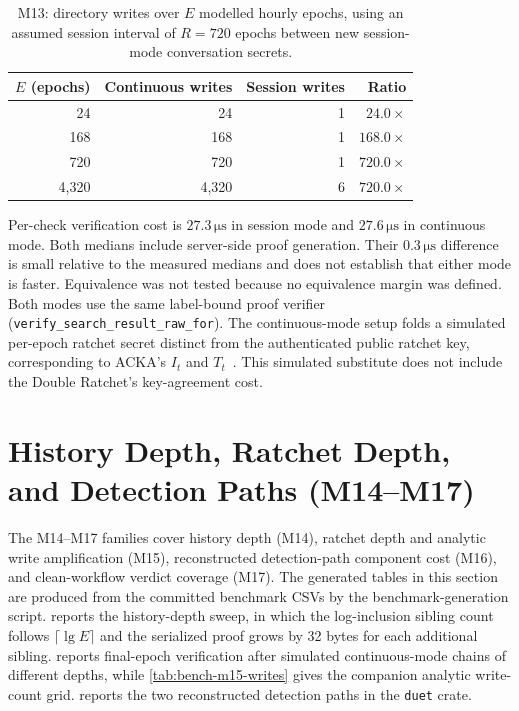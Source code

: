 \begin{table}[ht]
\centering
\caption[M13: directory writes by authentication mode.]{M13: directory writes over $E$ modelled
hourly epochs, using an assumed session interval of $R=720$ epochs between new session-mode
conversation secrets.}
\label{tab:bench-modes}
\small
\begin{tabular}{@{}rrrr@{}}
\toprule
$E$ (epochs) & Continuous writes & Session writes & Ratio \\
\midrule
24    & 24    & 1 & $24.0\times$ \\
168   & 168   & 1 & $168.0\times$ \\
720   & 720   & 1 & $720.0\times$ \\
4{,}320 & 4{,}320 & 6 & $720.0\times$ \\
\bottomrule
\end{tabular}
\end{table}

Per-check verification cost is $27.3\,\si{\micro\second}$ in session mode and
$27.6\,\si{\micro\second}$ in continuous mode. Both medians include server-side proof generation.
Their $0.3\,\si{\micro\second}$ difference is small relative to the measured medians and does not
establish that either mode is faster. Equivalence was not tested because no equivalence margin was defined.
Both modes use the same label-bound proof verifier
(\texttt{verify\_search\_result\_raw\_for}). The continuous-mode setup folds a simulated
per-epoch ratchet secret distinct from the authenticated public ratchet key, corresponding to
ACKA's $I_t$ and $T_t$~\cite{dowling2023acka}. This simulated substitute does not include
the Double Ratchet's key-agreement cost.

\FloatBarrier
\section{History Depth, Ratchet Depth, and Detection Paths (M14--M17)}\label{sec:bench-newfamilies}

The M14--M17 families cover history depth (M14), ratchet depth and analytic write amplification
(M15), reconstructed detection-path component cost (M16), and clean-workflow verdict coverage
(M17). The generated tables in this section are produced from the committed benchmark CSVs by the
benchmark-generation script.  reports the history-depth sweep, in which the
log-inclusion sibling count follows $\lceil\lg E\rceil$ and the serialized proof grows by
\num{32} bytes for each additional sibling.  reports final-epoch verification
after simulated continuous-mode chains of different depths, while
\cref{tab:bench-m15-writes} gives the companion analytic write-count grid.
 reports the two reconstructed detection paths in the \texttt{duet} crate.

